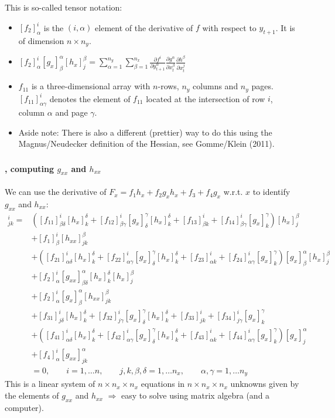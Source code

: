\documentclass[handout]{beamer}  %
\begin{document}
\begin{frame}
\frametitle{\secname}\framesubtitle{\subsecname}
This is so-called tensor notation:
\begin{itemize}
  \item $[f_2]_\alpha^i$ is the $(i,\alpha)$ element of the derivative of $f$ with respect to $y_{t+1}$. It is of dimension $n\times n_y$.
  \item $[f_2]_\alpha^i [g_x]_\beta^\alpha [h_x]_j^\beta=\sum_{\alpha=1}^{n_y}\sum_{\beta=1}^{n_x} \frac{\partial f^i}{\partial y_{t+1}^\alpha} \frac{\partial g^\alpha}{\partial x_{t}^\beta} \frac{\partial h^\beta}{\partial x_{t}^j}$
  \item $f_{11}$ is a three-dimensional array with $n$-rows, $n_y$ columns and $n_y$ pages. $[f_{11}]^i_{\alpha\gamma}$ denotes the element of $f_{11}$ located at the intersection of row $i$, column $\alpha$ and page $\gamma$.
  \item Aside note: There is also a different (prettier) way to do this using the Magnus/Neudecker definition of the Hessian, see Gomme/Klein (2011).
\end{itemize}
\end{frame}

\begin{frame}
  \frametitle{\secname}\framesubtitle{\subsecname, computing $g_{xx}$ and $h_{xx}$}\scriptsize
We can use the derivative of $F_x = f_1 h_x + f_2 g_x h_x + f_3 + f_4 g_x$ w.r.t. $x$ to identify $g_{xx}$ and $h_{xx}$:
\begin{align*}
  [F_{xx}(\overline{x},0)]^i_{jk} = &\left([f_{11}]^i_{\beta \delta} [h_x]_k^\delta + [f_{12}]^i_{\beta \gamma} [g_x]_\delta^\gamma [h_x]_k^\delta + [f_{13}]^i_{\beta k} + [f_{14}]^i_{\beta \gamma} [g_x]_k^\gamma\right)[h_x]_j^\beta\\
  &+[f_1]_\beta^i[h_{xx}]_{jk}^\beta\\
  &+\left([f_{21}]_{\alpha\delta}^i[h_x]_k^\delta + [f_{22}]_{\alpha\gamma}^i[g_x]_\delta^\gamma[h_x]_k^\delta + [f_{23}]_{\alpha k}^i + [f_{24}]_{\alpha \gamma}^i[g_x]_k^\gamma \right)[g_x]_\beta^\alpha[h_x]_j^\beta\\
  &+[f_2]_\alpha^i[g_{xx}]_{\beta\delta}^\alpha [h_x]_k^\delta [h_x]_j^\beta\\
  &+[f_2]_\alpha^i[g_x]_\beta^\alpha[h_{xx}]_{jk}^\beta\\
  &+[f_{31}]_{j\delta}^i[h_x]_k^\delta + [f_{32}]_{j\gamma}^i[g_x]_\delta^\gamma[h_x]_k^\delta + [f_{33}]_{jk}^i + [f_{34}]_{j\gamma}^i[g_x]_k^\gamma\\
  &+\left([f_{41}]_{\alpha\delta}^i[h_x]_k^\delta +[f_{42}]_{\alpha\gamma}^i[g_x]_\delta^\gamma[h_x]_k^\delta + [f_{43}]_{\alpha k}^i + [f_{44}]_{\alpha \gamma}^i [g_x]_k^\gamma \right)[g_x]_j^\alpha\\
  &+[f_4]_\alpha^i[g_{xx}]_{jk}^\alpha\\
  &= 0, \qquad i=1,\dots n,\qquad j,k,\beta,\delta = 1,\dots n_x, \qquad \alpha,\gamma=1,\dots n_y
\end{align*}
This is a linear system of $n\times n_x\times n_x$ equations in $n\times n_x\times n_x$ unknowns given by the elements of $g_{xx}$ and $h_{xx}$ $\Rightarrow$ easy to solve using matrix algebra (and a computer).
\end{frame}
\end{document}
